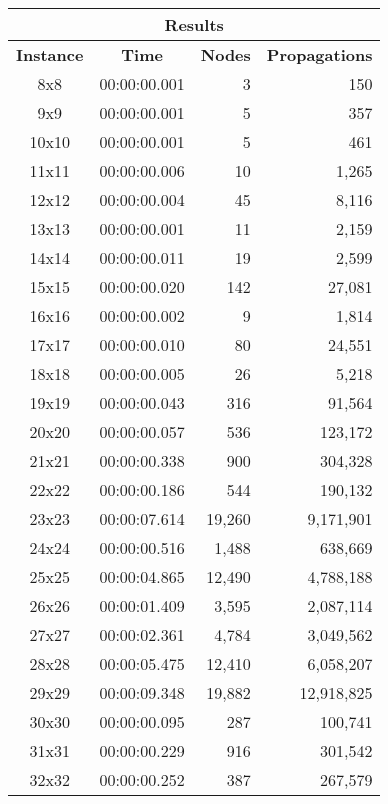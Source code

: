 
\begin{center}
    \begin{tabular}{|c|c|r|r|}
        \hline
        \multicolumn{4}{|c|}{\textbf{Results}} \\
        \hline
        \textbf{Instance} & \textbf{Time} & \textbf{Nodes} & \textbf{Propagations} \\
        
        \hline
		8x8 & 00:00:00.001 & 3 & 150 \\ \hline
		9x9 & 00:00:00.001 & 5 & 357 \\ \hline
		10x10 & 00:00:00.001 & 5 & 461 \\ \hline
		11x11 & 00:00:00.006 & 10 & 1,265 \\ \hline
		12x12 & 00:00:00.004 & 45 & 8,116 \\ \hline
		13x13 & 00:00:00.001 & 11 & 2,159 \\ \hline
		14x14 & 00:00:00.011 & 19 & 2,599 \\ \hline
		15x15 & 00:00:00.020 & 142 & 27,081 \\ \hline
		16x16 & 00:00:00.002 & 9 & 1,814 \\ \hline
		17x17 & 00:00:00.010 & 80 & 24,551 \\ \hline
		18x18 & 00:00:00.005 & 26 & 5,218 \\ \hline
		19x19 & 00:00:00.043 & 316 & 91,564 \\ \hline
		20x20 & 00:00:00.057 & 536 & 123,172 \\ \hline
		21x21 & 00:00:00.338 & 900 & 304,328 \\ \hline
		22x22 & 00:00:00.186 & 544 & 190,132 \\ \hline
		23x23 & 00:00:07.614 & 19,260 & 9,171,901 \\ \hline
		24x24 & 00:00:00.516 & 1,488 & 638,669 \\ \hline
		25x25 & 00:00:04.865 & 12,490 & 4,788,188 \\ \hline
		26x26 & 00:00:01.409 & 3,595 & 2,087,114 \\ \hline
		27x27 & 00:00:02.361 & 4,784 & 3,049,562 \\ \hline
		28x28 & 00:00:05.475 & 12,410 & 6,058,207 \\ \hline
		29x29 & 00:00:09.348 & 19,882 & 12,918,825 \\ \hline
		30x30 & 00:00:00.095 & 287 & 100,741 \\ \hline
		31x31 & 00:00:00.229 & 916 & 301,542 \\ \hline
		32x32 & 00:00:00.252 & 387 & 267,579 \\ \hline

\end{tabular}
\end{center}
